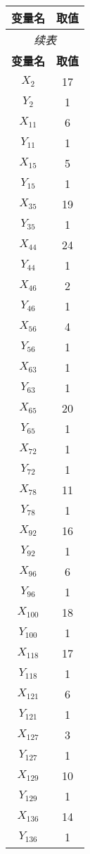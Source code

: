 \documentclass[a4paper,10pt]{article}
\begin{document}
\begin{center}
\begin{longtable}{cc}
\toprule
\textbf{变量名} & \textbf{取值} \\
\midrule
\endfirsthead
\multicolumn{2}{c}{\textit{续表}} \\
\toprule
\textbf{变量名} & \textbf{取值} \\
\midrule
\endhead
\bottomrule
\endfoot
\bottomrule
\endlastfoot
$X_{2}$ & 17 \\
$Y_{2}$ & 1 \\
$X_{11}$ & 6 \\
$Y_{11}$ & 1 \\
$X_{15}$ & 5 \\
$Y_{15}$ & 1 \\
$X_{35}$ & 19 \\
$Y_{35}$ & 1 \\
$X_{44}$ & 24 \\
$Y_{44}$ & 1 \\
$X_{46}$ & 2 \\
$Y_{46}$ & 1 \\
$X_{56}$ & 4 \\
$Y_{56}$ & 1 \\
$X_{63}$ & 1 \\
$Y_{63}$ & 1 \\
$X_{65}$ & 20 \\
$Y_{65}$ & 1 \\
$X_{72}$ & 1 \\
$Y_{72}$ & 1 \\
$X_{78}$ & 11 \\
$Y_{78}$ & 1 \\
$X_{92}$ & 16 \\
$Y_{92}$ & 1 \\
$X_{96}$ & 6 \\
$Y_{96}$ & 1 \\
$X_{100}$ & 18 \\
$Y_{100}$ & 1 \\
$X_{118}$ & 17 \\
$Y_{118}$ & 1 \\
$X_{121}$ & 6 \\
$Y_{121}$ & 1 \\
$X_{127}$ & 3 \\
$Y_{127}$ & 1 \\
$X_{129}$ & 10 \\
$Y_{129}$ & 1 \\
$X_{136}$ & 14 \\
$Y_{136}$ & 1 \\
\end{longtable}
\end{center}
\end{document}
